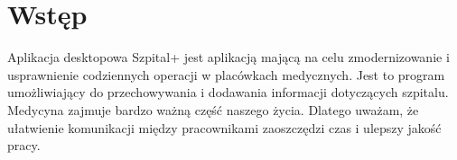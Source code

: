 \section{\LARGE{Wstęp}}

\begin{flushleft}
\large{\hspace{5mm} \textquotedbl Aplikacja desktopowa Szpital+\textquotedbl{} jest aplikacją mającą na celu zmodernizowanie i usprawnienie codziennych operacji w placówkach medycznych. Jest to program umożliwiający do przechowywania i dodawania informacji dotyczących szpitalu. Medycyna zajmuje bardzo ważną część naszego życia. Dlatego uważam, że ułatwienie komunikacji między pracownikami zaoszczędzi czas i ulepszy jakość pracy. }
\end{flushleft}